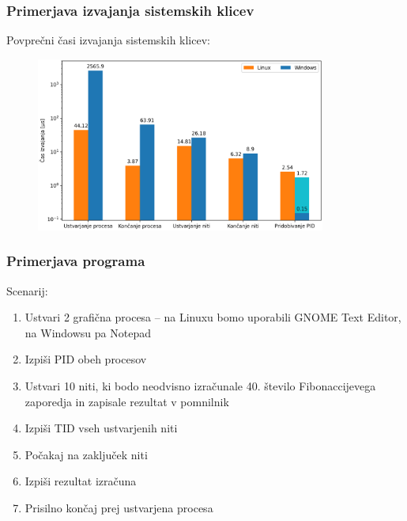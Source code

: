 \documentclass{beamer}
\begin{document}
\begin{frame}
	\frametitle{Primerjava izvajanja sistemskih klicev}
	Povprečni časi izvajanja sistemskih klicev:
	\begin{figure}
		\begin{center}
			\includegraphics[width=0.85\textwidth]{images/syscall_comparison_w5a.png}
		\end{center}
	\end{figure}
\end{frame}

\begin{frame}
	\frametitle{Primerjava programa}
	Scenarij:
	\begin{enumerate}
		\item Ustvari 2 grafična procesa -- na Linuxu bomo uporabili GNOME Text Editor, na Windowsu pa Notepad
		\item Izpiši PID obeh procesov
		\item Ustvari 10 niti, ki bodo neodvisno izračunale 40. število Fibonaccijevega zaporedja in zapisale rezultat v pomnilnik
		\item Izpiši TID vseh ustvarjenih niti
		\item Počakaj na zaključek niti
		\item Izpiši rezultat izračuna
		\item Prisilno končaj prej ustvarjena procesa
	\end{enumerate}
\end{frame}
\end{document}
